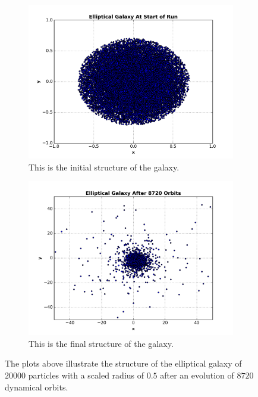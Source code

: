 \documentclass[12pt]{report}
\begin{document}
\begin{figure}[H]
\centering 
    \begin{subfigure}[b]{.475\textwidth}
        \centering
        \includegraphics[width=\linewidth]{intiial_structure_of_cloud.png}
        \caption[]%
        {{\small This is the initial structure of the galaxy.}}
        \label{fig:pressurecomparisionfigure}
    \end{subfigure} %
    \hfill
    \begin{subfigure}[b]{.475\textwidth}
        \centering
        \includegraphics[width=\linewidth]{final_structure_of_cloud.png}
        \caption[]%
        {{\small This is the final structure of the galaxy.}}
        \label{fig:beta}
    \end{subfigure} %
    \caption[]
        {The plots above illustrate the structure of the elliptical galaxy of $20000$ particles with a scaled radius of $0.5$ after an evolution of $8720$ dynamical orbits.} 
        \label{fig:cloudstructure}
\end{figure}
\end{document}

